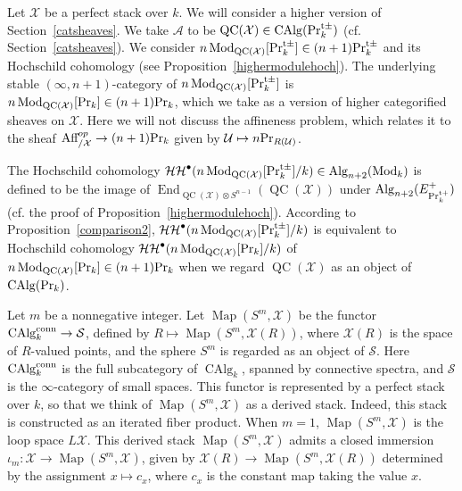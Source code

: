\documentclass[leqno,12pt]{amsart}
\theoremstyle{plain}
\theoremstyle{definition}
\newcommand{\HH}{\operatorname{\mathcal{HH}}}
\newcommand{\AAA}{\mathcal{A}}
\newcommand{\PR}{\textup{Pr}}
\newcommand{\PRTT}{\textup{Pr}^{\textup{t}+}}
\newcommand{\PRTTT}{\textup{Pr}^{\textup{t}\pm}}
\newcommand{\Mod}{\operatorname{Mod}}
\newcommand{\SSS}{\mathcal{S}}
\newcommand{\Map}{\operatorname{Map}}
\newcommand{\Alg}{\operatorname{Alg}}
\newcommand{\End}{\operatorname{End}}
\newcommand{\CAlg}{\operatorname{CAlg}}
\newcommand{\QC}{\operatorname{QC}}
\newcommand{\XX}{\mathcal{X}}
\begin{document}
\label{highercatsheaves}




Let $\XX$ be a perfect stack over $k$.
We will consider a higher version of Section~\ref{catsheaves}.
We take $\AAA$ to be $\QC(\mathcal{X})\in \CAlg(\PRTTT_k)$ (cf. Section~\ref{catsheaves}).
We consider $n\Mod_{\QC(\mathcal{X})}[\PRTTT_k]\in (n+1)\PRTTT_k$ and its Hochschild cohomology (see Proposition~\ref{highermodulehoch}).
The underlying stable $(\infty,n+1)$-category of 
$n\Mod_{\QC(\mathcal{X})}[\PRTTT_k]$ is $n\Mod_{\QC(\mathcal{X})}[\PR_k] \in (n+1)\PR_k$, which we take as a version of
higher categorified sheaves on $\XX$.
Here we will not discuss the affineness problem, which relates it to the sheaf $\textup{Aff}_{/\XX}^{op}\to (n+1)\PR_k$ given by $\mathcal{U}\mapsto n\PR_{R(\mathcal{U})}$.




The Hochschild cohomology $\HH^\bullet(n\Mod_{\QC(\mathcal{X})}[\PRTTT_k]/k)\in \Alg_{n+2}(\Mod_k)$ is defined to be the image of $\End_{\QC(\mathcal{X})\otimes S^{n-1}}(\QC(\mathcal{X}))$  under
$\Alg_{n+2}(E^+_{\PRTT_k})$ (cf. the proof of Proposition~\ref{highermodulehoch}).
According to Proposition~\ref{comparison2}, $\HH^\bullet(n\Mod_{\QC(\mathcal{X})}[\PRTTT_k]/k)$ is equivalent to 
Hochschild cohomology $\HH^\bullet(n\Mod_{\QC(\mathcal{X})}[\PR_k]/k)$
of $n\Mod_{\QC(\mathcal{X})}[\PR_k]\in (n+1)\PR_k$ when we regard $\QC(\XX)$ as an object of $\CAlg(\PR_k)$.


Let $m$ be a nonnegative integer.
Let $\Map(S^{m}, \mathcal{X})$ be the functor $\CAlg_k^{\textup{conn}}\to \SSS$, defined by $R\mapsto \Map(S^{m}, \mathcal{X}(R))$,
where $\mathcal{X}(R)$ is the space of $R$-valued points, and the sphere $S^{m}$ is regarded as an object of $\SSS$. Here $\CAlg_k^{\textup{conn}}$
is the full subcategory of $\CAlg_k$, spanned by connective spectra, and $\SSS$ is the $\infty$-category of small spaces.
This functor is represented by a perfect stack over $k$,
so that we think of $\Map(S^{m}, \mathcal{X})$ as a derived stack. Indeed, this stack is constructed as an iterated fiber product.
When $m=1$, $\Map(S^{m}, \mathcal{X})$ is the loop space $L\XX$.
This derived stack $\Map(S^{m}, \mathcal{X})$ admits a closed immersion $\iota_m:\XX\to \Map(S^{m}, \mathcal{X})$,
given by $\XX(R)\to \Map(S^m,\XX(R))$ determined by the assignment $x\mapsto c_x$,
where $c_x$ is the constant map taking the value $x$.
\end{document}
